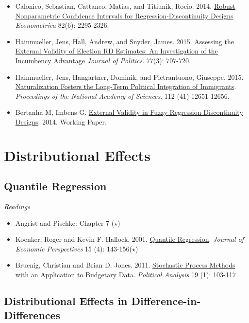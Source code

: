 \documentclass{article}
\begin{document}
\begin{itemize}
\item Calonico, Sebastian, Cattaneo, Matias, and Titiunik, Rocio. 2014. \href{http://onlinelibrary.wiley.com/doi/10.3982/ECTA11757/abstract}{Robust Nonparametric Confidence Intervals for Regression-Discontinuity Designs} \textit{Econometrica} 82(6): 2295-2326.
\item Hainmueller, Jens, Hall, Andrew, and Snyder, James. 2015. \href{http://www.jstor.org/stable/10.1086/681238}{Assessing the External Validity of Election RD Estimates: An Investigation of the Incumbency Advantage} \textit{Journal of Politics}. 77(3): 707-720.
\item Hainmueller, Jens, Hangartner, Dominik, and Pietrantuono, Giuseppe. 2015. \href{http://www.pnas.org/content/112/41/12651.abstract?sid=8efc8281-95c9-4973-9a2c-bae8df47fd4a}{Naturalization Fosters the Long-Term Political Integration of Immigrants}. \textit{Proceedings of the National Academy of Sciences}. 112 (41) 12651-12656.
\item Bertanha M, Imbens G. \href{http://www.nber.org/papers/w20773}{External Validity in Fuzzy Regression Discontinuity Designs}. 2014. Working Paper.

\end{itemize}

\section{Distributional Effects}

\subsection{Quantile Regression}

\emph{Readings}
\begin{itemize}
\item Angrist and Pischke: Chapter 7 ($\star$)
\item Koenker, Roger and Kevin F. Hallock. 2001.  \href{http://www.jstor.org/stable/2696522} {Quantile Regression}. \textit{Journal of Economic Perspectives} 15 (4): 143-156($\star$)
\item Bruenig, Christian and Brian D. Jones. 2011. \href{http://pan.oxfordjournals.org/content/19/1/103.full.pdf+html}{Stochastic Process Methods with an Application to Budgetary Data}. \textit{Political Analysis} 19 (1): 103-117
\end{itemize}

\subsection{Distributional Effects in Difference-in-Differences}
\end{document}
